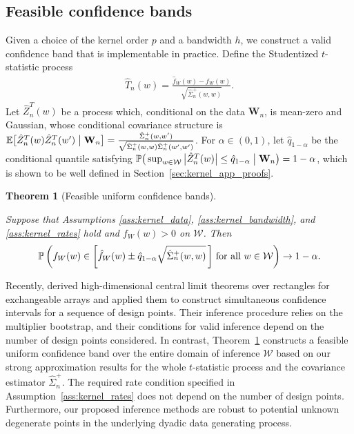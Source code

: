\documentclass[11pt,lof]{puthesis}
\renewcommand{\P}{\ensuremath{\mathbb{P}}}
\newcommand{\E}{\ensuremath{\mathbb{E}}}
\newcommand{\bW}{\ensuremath{\mathbf{W}}}
\newcommand{\cW}{\ensuremath{\mathcal{W}}}
\theoremstyle{break}
\newtheorem{theorem}{Theorem}[section]
\theoremstyle{proof}
\begin{document}
\subsection{Feasible confidence bands}
\label{sec:kernel_feasible_confidence_bands}

Given a choice of the kernel order $p$ and a bandwidth $h$, we construct a
valid confidence band that is implementable in practice. Define the Studentized
$t$-statistic process
%
\begin{align*}
  \hat T_n(w) = \frac{\hat{f}_W(w) - f_W(w)}{\sqrt{\hat \Sigma_n^+(w,w)}}.
\end{align*}
%
Let $\hat Z_n^T(w)$ be a process which, conditional on the data $\bW_n$,
is mean-zero and Gaussian, whose conditional covariance structure is
$\E\big[ \hat Z_n^T(w) \hat Z_n^T(w') \bigm\vert \bW_n \big]
= \frac{\hat \Sigma_n^+(w,w')}
{\sqrt{\hat \Sigma_n^+(w,w) \hat \Sigma_n^+(w',w')}}$.
For $\alpha \in (0,1)$, let $\hat q_{1-\alpha}$ be the
conditional quantile satisfying
$\P\big(\sup_{w \in \cW} \big| \hat Z_n^T(w) \big| \leq \hat q_{1-\alpha}
\bigm\vert \bW_n \big) = 1 - \alpha$,
which is shown to be well defined in Section~\ref{sec:kernel_app_proofs}.

\begin{theorem}[Feasible uniform confidence bands]
  \label{thm:kernel_ucb}

  Suppose that Assumptions \ref{ass:kernel_data}, \ref{ass:kernel_bandwidth},
  and \ref{ass:kernel_rates} hold and $f_W(w) > 0$ on $\cW$. Then
  \begin{align*}
    \P\left(
      f_W(w) \in
      \left[ \hat f_W(w) \pm \hat q_{1-\alpha}
      \sqrt{\hat\Sigma_n^+(w,w)} \,\right]
      \,\textup{for all } w \in \cW
    \right) \to 1 - \alpha.
  \end{align*}
\end{theorem}

Recently, \citet{chiang2022inference} derived high-dimensional central limit
theorems over rectangles for exchangeable arrays and applied them to construct
simultaneous confidence intervals for a sequence of design points. Their
inference procedure relies on the multiplier bootstrap, and their conditions
for valid inference depend on the number of design points considered. In
contrast, Theorem~\ref{thm:kernel_ucb} constructs a feasible uniform confidence
band over the entire domain of inference $\cW$ based on our strong
approximation results for the whole $t$-statistic process and the covariance
estimator $\hat\Sigma_n^+$. The required rate condition specified in
Assumption~\ref{ass:kernel_rates} does not depend on the number of design
points.
Furthermore, our proposed inference methods are robust to potential unknown
degenerate points in the underlying dyadic data generating process.
\end{document}
